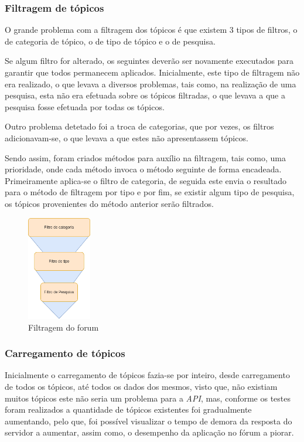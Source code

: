 \subsubsection{Filtragem de tópicos}
O grande problema com a filtragem dos tópicos é que existem 3 tipos de filtros, o de categoria de tópico, o de tipo de tópico e o de pesquisa. 

Se algum filtro for alterado, os seguintes deverão ser novamente executados para garantir que todos permanecem aplicados. Inicialmente, este tipo de filtragem não era realizado, o que levava a diversos problemas, tais como, na realização de uma pesquisa, esta não era efetuada sobre os tópicos filtradas, o que levava a que a pesquisa fosse efetuada por todas os tópicos.

Outro problema detetado foi a troca de categorias, que por vezes, os filtros adicionavam-se, o que levava a que estes não apresentassem tópicos.

Sendo assim, foram criados métodos para auxílio na filtragem, tais como, uma prioridade, onde cada método invoca o método seguinte de forma encadeada. Primeiramente aplica-se o filtro de categoria, de seguida este envia o resultado para o método de filtragem por tipo e por fim, se existir algum tipo de pesquisa, os tópicos provenientes do método anterior serão filtrados.

\begin{figure}[htb]
 \centering
 \includegraphics[width=0.25\textwidth]{images/implementacao/frontend/forum/filtros/filtros.png}
 \caption{Filtragem do forum}
 \label{fig:73}
\end{figure}

\newpage

\subsubsection{Carregamento de tópicos}
Inicialmente o carregamento de tópicos fazia-se por inteiro, desde carregamento de todos os tópicos, até todos os dados dos mesmos, visto que, não existiam muitos tópicos este não seria um problema para a \textit{API}, mas, conforme os testes foram realizados a quantidade de tópicos existentes foi gradualmente aumentando, pelo que, foi possível visualizar o tempo de demora da resposta do servidor a aumentar, assim como, o desempenho da aplicação no fórum a piorar.

